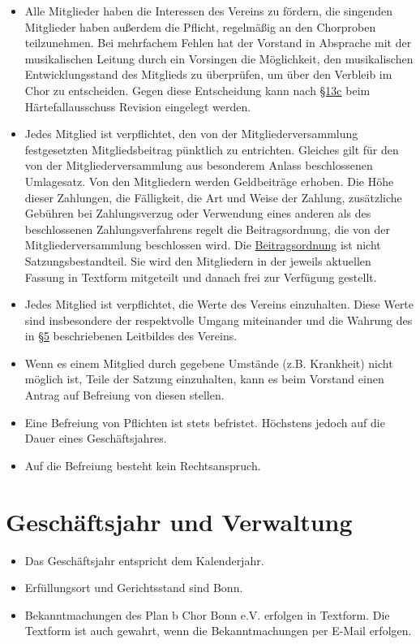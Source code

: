 \documentclass[12pt,paper=a4,ngerman]{report}
\begin{document}
\begin{itemize}
    \item Alle Mitglieder haben die Interessen des Vereins zu fördern, die singenden Mitglieder haben außerdem die Pflicht, regelmäßig an den Chorproben teilzunehmen. Bei mehrfachem Fehlen hat der Vorstand in Absprache mit der musikalischen Leitung durch ein Vorsingen die Möglichkeit, den musikalischen Entwicklungsstand des Mitglieds zu überprüfen, um über den Verbleib im Chor zu entscheiden. Gegen diese Entscheidung kann nach \hyperref[par-13]{§13c} beim Härtefallausschuss Revision eingelegt werden.
    \item Jedes Mitglied ist verpflichtet, den von der Mitgliederversammlung festgesetzten Mitgliedsbeitrag pünktlich zu entrichten. Gleiches gilt für den von der Mitgliederversammlung aus besonderem Anlass beschlossenen Umlagesatz. Von den Mitgliedern werden Geldbeiträge erhoben. Die Höhe dieser Zahlungen, die Fälligkeit, die Art und Weise der Zahlung, zusätzliche Gebühren bei Zahlungsverzug oder Verwendung eines anderen als des beschlossenen Zahlungsverfahrens regelt die Beitragsordnung, die von der Mitgliederversammlung beschlossen wird. Die \href{https://plan-b-chor.de/dokumente}{Beitragsordnung} ist nicht Satzungsbestandteil. Sie wird den Mitgliedern in der jeweils aktuellen Fassung in Textform mitgeteilt und danach frei zur Verfügung gestellt.
    \item Jedes Mitglied ist verpflichtet, die Werte des Vereins einzuhalten. Diese Werte sind insbesondere der respektvolle Umgang miteinander und die Wahrung des in \hyperref[par-5]{§5} beschriebenen Leitbildes des Vereins.
    \item Wenn es einem Mitglied durch gegebene Umstände (z.B. Krankheit) nicht möglich ist, Teile der Satzung einzuhalten, kann es beim Vorstand einen Antrag auf Befreiung von diesen stellen.
    \item Eine Befreiung von Pflichten ist stets befristet. Höchstens jedoch auf die Dauer eines Geschäftsjahres.
    \item Auf die Befreiung besteht kein Rechtsanspruch.
\end{itemize}

\section{Geschäftsjahr und Verwaltung}

\begin{itemize}
    \item Das Geschäftsjahr entspricht dem Kalenderjahr.
    \item Erfüllungsort und Gerichtsstand sind Bonn.
    \item Bekanntmachungen des Plan b Chor Bonn e.V. erfolgen in Textform. Die Textform ist auch gewahrt, wenn die Bekanntmachungen per E-Mail erfolgen.
\end{itemize}
\end{document}
